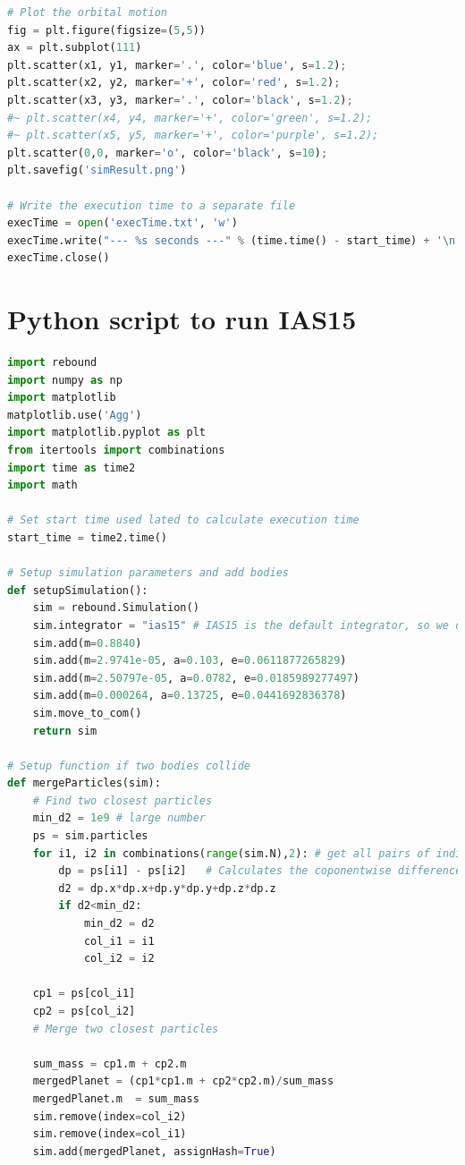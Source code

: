 \documentclass[12pt]{report}
\begin{document}
\begin{appendix}
\begin{lstlisting}[language=Python]
# Plot the orbital motion
fig = plt.figure(figsize=(5,5))
ax = plt.subplot(111)
plt.scatter(x1, y1, marker='.', color='blue', s=1.2);
plt.scatter(x2, y2, marker='+', color='red', s=1.2);
plt.scatter(x3, y3, marker='.', color='black', s=1.2);
#~ plt.scatter(x4, y4, marker='+', color='green', s=1.2);
#~ plt.scatter(x5, y5, marker='+', color='purple', s=1.2);
plt.scatter(0,0, marker='o', color='black', s=10);
plt.savefig('simResult.png')

# Write the execution time to a separate file
execTime = open('execTime.txt', 'w')
execTime.write("--- %s seconds ---" % (time.time() - start_time) + '\n')
execTime.close()

\end{lstlisting}
\chapter{Python script to run IAS15}
\begin{lstlisting}[language=Python]
import rebound
import numpy as np
import matplotlib
matplotlib.use('Agg')
import matplotlib.pyplot as plt
from itertools import combinations
import time as time2
import math

# Set start time used lated to calculate execution time
start_time = time2.time()

# Setup simulation parameters and add bodies
def setupSimulation():
	sim = rebound.Simulation()
	sim.integrator = "ias15" # IAS15 is the default integrator, so we don't need this line
	sim.add(m=0.8840)
	sim.add(m=2.9741e-05, a=0.103, e=0.0611877265829)
	sim.add(m=2.50797e-05, a=0.0782, e=0.0185989277497)
	sim.add(m=0.000264, a=0.13725, e=0.0441692836378)
	sim.move_to_com()
	return sim
    
# Setup function if two bodies collide
def mergeParticles(sim):
    # Find two closest particles
    min_d2 = 1e9 # large number
    ps = sim.particles
    for i1, i2 in combinations(range(sim.N),2): # get all pairs of indices
        dp = ps[i1] - ps[i2]   # Calculates the coponentwise difference between particles
        d2 = dp.x*dp.x+dp.y*dp.y+dp.z*dp.z
        if d2<min_d2:
            min_d2 = d2
            col_i1 = i1
            col_i2 = i2

    cp1 = ps[col_i1]
    cp2 = ps[col_i2]
    # Merge two closest particles

    sum_mass = cp1.m + cp2.m
    mergedPlanet = (cp1*cp1.m + cp2*cp2.m)/sum_mass
    mergedPlanet.m  = sum_mass
    sim.remove(index=col_i2)
    sim.remove(index=col_i1)
    sim.add(mergedPlanet, assignHash=True)



\end{lstlisting}
\end{appendix}
\end{document}
